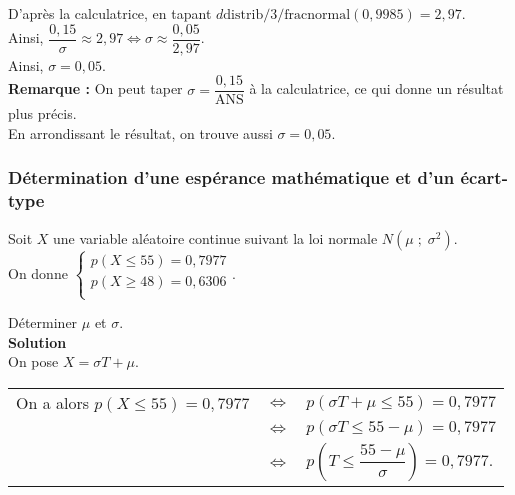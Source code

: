 \vspace*{.3cm} 

D'après la calculatrice, en tapant $d\mathrm{distrib}/3/\mathrm{fracnormal}\left(0,9985\right) = 2,97$. \\

Ainsi, $\dfrac{0,15}{\sigma} \approx 2,97 \Longleftrightarrow \sigma \approx \dfrac{0,05}{2,97}$. \\

Ainsi, $\sigma = 0,05$. \\

\textbf{Remarque :} On peut taper $\sigma = \dfrac{0,15}{\mathrm{ANS}}$ à la calculatrice, ce qui donne un résultat plus précis. \\

En arrondissant le résultat, on trouve aussi $\sigma = 0,05$.

\vspace*{-5cm}

\newpage

\subsubsection{Détermination d'une espérance mathématique et d'un écart-type}

Soit $X$ une variable aléatoire continue suivant la loi normale $N\left(\mu \; ; \; \sigma^2\right)$. \\

On donne $\left\{
  \begin{array}{l}
    p\left(X \leqslant 55\right) = 0,7977 \\
    p\left(X \geqslant 48\right) = 0,6306 \\
  \end{array}
\right.$.

\vspace*{.3cm}

Déterminer $\mu$ et $\sigma$. \\

\textbf{Solution} \\

On pose $X = \sigma T + \mu$. \\

\begin{tabular}{lll}
\hspace*{-.3cm} On a alors $p\left(X \leqslant 55\right) = 0,7977$ & $\Longleftrightarrow$ & $p\left(\sigma T + \mu \leqslant 55\right) = 0,7977$ \vspace*{.3cm} \\
& $\Longleftrightarrow$ & $p\left(\sigma T \leqslant 55 - \mu\right) = 0,7977$ \vspace*{.3cm} \\
& $\Longleftrightarrow$ & $p\left(T \leqslant \dfrac{55 - \mu}{\sigma}\right) = 0,7977$. \\
\end{tabular}

